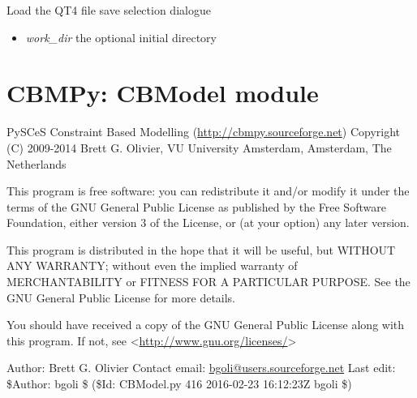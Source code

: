 \documentclass[a4paper,11pt,english]{sphinxmanual}
\begin{document}

\begin{fulllineitems}
\label{modules_doc:cbmpy.CBGUI.saveFileName}
Load the QT4 file save selection dialogue
\begin{itemize}
\item {} 
\emph{work\_dir} the optional initial directory

\end{itemize}

\end{fulllineitems}

\label{modules_doc:module-cbmpy.CBModel}

\section{CBMPy: CBModel module}
\label{modules_doc:cbmpy-cbmodel-module}
PySCeS Constraint Based Modelling (\href{http://cbmpy.sourceforge.net}{http://cbmpy.sourceforge.net})
Copyright (C) 2009-2014 Brett G. Olivier, VU University Amsterdam, Amsterdam, The Netherlands

This program is free software: you can redistribute it and/or modify
it under the terms of the GNU General Public License as published by
the Free Software Foundation, either version 3 of the License, or
(at your option) any later version.

This program is distributed in the hope that it will be useful,
but WITHOUT ANY WARRANTY; without even the implied warranty of
MERCHANTABILITY or FITNESS FOR A PARTICULAR PURPOSE.  See the
GNU General Public License for more details.

You should have received a copy of the GNU General Public License
along with this program.  If not, see \textless{}\href{http://www.gnu.org/licenses/}{http://www.gnu.org/licenses/}\textgreater{}

Author: Brett G. Olivier
Contact email: \href{mailto:bgoli@users.sourceforge.net}{bgoli@users.sourceforge.net}
Last edit: \$Author: bgoli \$ (\$Id: CBModel.py 416 2016-02-23 16:12:23Z bgoli \$)
\end{document}
